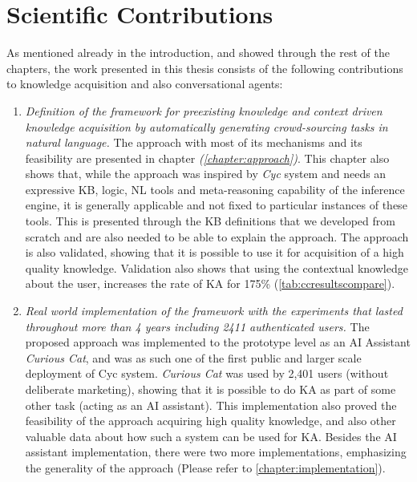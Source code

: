 \section{Scientific Contributions}
As mentioned already in the introduction, and showed through the rest of the
chapters, the work presented in this thesis consists of the following 
contributions to knowledge acquisition and also conversational agents:
\begin{enumerate}
	\item \emph{Definition of the framework for preexisting knowledge and
	context	driven knowledge acquisition by automatically generating 
	crowd-sourcing tasks in natural language.} The approach with most of its
	 mechanisms and its feasibility are presented in chapter 
	 \emph{ (\autoref{chapter:approach})}. 
	This chapter
	also shows that, while the approach was inspired by \emph{Cyc} system and needs an expressive KB, logic,	NL tools and meta-reasoning capability of
	the inference engine, it is generally applicable and not fixed to
	particular instances of these tools. This is presented through the 
	KB	definitions that we developed from scratch and are also needed to be
	able to explain the approach. The approach is also validated, showing that
	it is possible to use it for acquisition of a high quality knowledge. 
	Validation also shows that using the contextual knowledge about the user,
	increases the rate of KA for 175\% (\autoref{tab:ccresultscompare}).
	
	\item \emph{Real world implementation of the framework with the experiments 
	that lasted throughout more than 4 years including 2411 authenticated 
	users.} The proposed approach was implemented to the prototype level as an AI Assistant \emph{Curious Cat}, and was as such one of the first public and larger scale deployment of Cyc system. \emph{Curious Cat} was used by
	 2,401 users (without deliberate marketing), showing that it is possible to
	 do KA as part of some
	other task (acting as an AI assistant). This implementation also proved 
	the feasibility of the approach acquiring high quality knowledge, and 
	also other valuable data about how such a system can be used for KA. Besides
	the AI assistant implementation, there were two more implementations, 
	emphasizing the generality of the approach (Please refer to \autoref{chapter:implementation}).


\end{enumerate}
